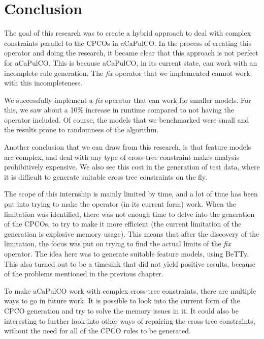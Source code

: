 \chapter{Conclusion}\label{ch:conclusion}
The goal of this research was to create a hybrid approach to deal with
complex constraints parallel to the CPCOs in aCaPulCO. In the process of
creating this operator and doing the research, it became clear that this
approach is not perfect for aCaPulCO. This is because aCaPulCO, in its
current state, can work with an incomplete rule generation. The \emph{fix}
operator that we implemented cannot work with this incompleteness.

We successfully implement a \emph{fix} operator that can work for smaller
models. For this, we saw about a 10\% increase in runtime compared to not
having the operator included. Of course, the models that we benchmarked
were small and the results prone to randomness of the algorithm. 

Another conclusion that we can draw from this research, is that feature
models are complex, and deal with any type of cross-tree constraint
makes analysis prohibitively expensive. We also see this cost in the
generation of test data, where it is difficult to generate suitable cross
tree constraints on the fly. 

The scope of this internship is mainly limited by time, and a lot of time
has been put into trying to make the operator (in its current form) work.
When the limitation was identified, there was not enough time to delve into
the generation of the CPCOs, to try to make it more efficient (the current
limitation of the generation is explosive memory usage). This means that
after the discovery of the limitation, the focus was put on trying to find
the actual limits of the \emph{fix} operator. The idea here was to generate
suitable feature models, using BeTTy. This also turned out to be a timesink 
that did not yield positive results, because of the problems mentioned in
the previous chapter.

To make aCaPulCO work with complex cross-tree constraints, there are multiple
ways to go in future work. It is possible to look into the current form of
the CPCO generation and try to solve the memory issues in it. It could also
be interesting to further look into other ways of repairing the cross-tree
constraints, without the need for all of the CPCO rules to be generated. 
